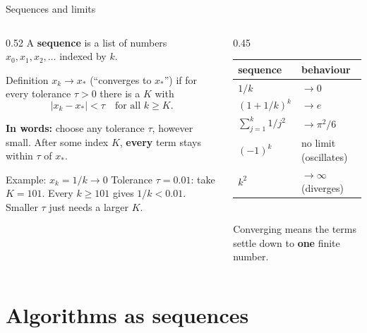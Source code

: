 \documentclass[aspectratio=169]{beamer}
\begin{document}
\begin{frame}{Sequences and limits}
\begin{columns}[T]
\begin{column}{0.52\textwidth}
\small
A \textbf{sequence} is a list of numbers $x_0, x_1, x_2, \ldots$ indexed by $k$.
\begin{block}{Definition}
$x_k \to x_\ast$ (``converges to $x_\ast$'') if for every tolerance $\tau > 0$ there is a $K$ with
\[ |x_k - x_\ast| < \tau \quad \text{for all } k \ge K. \]
\end{block}
\footnotesize \textbf{In words:} choose any tolerance $\tau$, however small. After some index $K$, \textbf{every} term stays within $\tau$ of $x_\ast$.
\begin{exampleblock}{Example: $x_k = 1/k \to 0$}
\footnotesize Tolerance $\tau = 0.01$: take $K = 101$. Every $k \ge 101$ gives $1/k < 0.01$.\\
Smaller $\tau$ just needs a larger $K$.
\end{exampleblock}
\end{column}
\begin{column}{0.45\textwidth}
\small
\renewcommand{\arraystretch}{1.25}
\begin{tabular}{ll}
\toprule
sequence & behaviour \\
\midrule
$1/k$ & $\to 0$ \\
$(1+1/k)^k$ & $\to e$ \\
$\sum_{j=1}^{k} 1/j^2$ & $\to \pi^2/6$ \\
$(-1)^k$ & no limit (oscillates) \\
$k^2$ & $\to \infty$ (diverges) \\
\bottomrule
\end{tabular}\\[8pt]
\footnotesize Converging means the terms settle down to \textbf{one} finite number.
\end{column}
\end{columns}
\end{frame}

\section{Algorithms as sequences}
\end{document}
